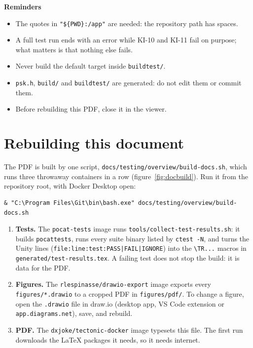 \documentclass[11pt,a4paper]{article}
\DeclareRobustCommand{\_}{\textunderscore\allowbreak}
\newcommand{\cd}[1]{\texttt{#1}}
\newcommand{\PWD}{\$\{PWD\}}
\begin{document}
\textbf{Reminders}
\begin{itemize}
\item The quotes in \cd{"\PWD:/app"} are needed: the repository path has spaces.
\item A full test run ends with an error while KI-10 and KI-11 fail on purpose;
  what matters is that nothing else fails.
\item Never build the default target inside \cd{build\_test/}.
\item \cd{psk.h}, \cd{build/} and \cd{build\_test/} are generated: do not edit them or commit them.
\item Before rebuilding this PDF, close it in the viewer.
\end{itemize}

\clearpage
\section{Rebuilding this document}\label{sec:rebuild}

The PDF is built by one script, \cd{docs/testing/overview/build-docs.sh}, which runs three
throwaway containers in a row (figure~\ref{fig:docbuild}). Run it from the repository root, with
Docker Desktop open:
\begin{lstlisting}
& "C:\Program Files\Git\bin\bash.exe" docs/testing/overview/build-docs.sh
\end{lstlisting}

\begin{enumerate}
\item \textbf{Tests.} The \cd{pocat-tests} image runs \cd{tools/collect-test-results.sh}: it builds
  \cd{pocat\_tests}, runs every suite binary listed by \cd{ctest -N}, and turns the Unity lines
  (\cd{file:line:test:PASS|FAIL|IGNORE}) into the \cd{\textbackslash TR...} macros in
  \cd{generated/test-results.tex}. A failing test does not stop the build: it is data for the PDF.
\item \textbf{Figures.} The \cd{rlespinasse/drawio-export} image exports every
  \cd{figures/*.drawio} to a cropped PDF in \cd{figures/pdf/}. To change a figure, open the
  \cd{.drawio} file in draw.io (desktop app, VS Code extension or \cd{app.diagrams.net}), save,
  and rebuild.
\item \textbf{PDF.} The \cd{dxjoke/tectonic-docker} image typesets this file. The first run downloads
  the LaTeX packages it needs, so it needs internet.
\end{enumerate}
\end{document}
